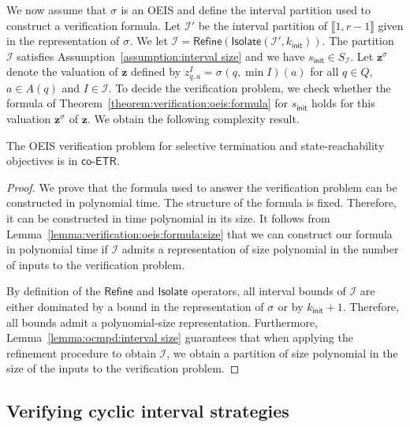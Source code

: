 \documentclass[a4paper,UKenglish,cleveref,autoref,thm-restate,colorlinks]{lipics-v2021}
\newcommand{\init}{\mathsf{init}}
\newcommand{\integerInterval}[1]{\llbracket{}#1\rrbracket{}}
\newcommand{\coetr}{\textsf{co-ETR}}
\newcommand{\mdpStateSpace}{S}
\newcommand{\ocStateSpace}{Q}
\newcommand{\ocState}{q}
\newcommand{\ocCount}{k}
\newcommand{\ocConfig}{s}
\newcommand{\ocActionSpace}{A}
\newcommand{\ocAction}{a}
\newcommand{\counterUB}{r}
\newcommand{\intPart}{\mathcal{I}}
\newcommand{\interval}{I}
\newcommand{\compressChainStateSpace}{\mdpStateSpace_{\intPart}}
\newcommand{\varStrat}{z}
\newcommand{\varStratTuple}{\mathbf{\varStrat}}
\newcommand{\vectStratTuple}{\varStratTuple^\strat}
\newcommand{\stratGeneric}[1]{{\sigma_{#1}}}
\newcommand{\strat}{\stratGeneric{}}
\begin{document}
We now assume that $\strat$ is an OEIS and define the interval partition used to construct a verification formula.
Let $\intPart'$ be the interval partition of $\integerInterval{1, \counterUB-1}$ given in the representation of $\strat$.
We let $\intPart = \mathsf{Refine}(\mathsf{Isolate}(\intPart', \ocCount_\init))$.
The partition $\intPart$ satisfies Assumption~\ref{assumption:interval size} and we have $\ocConfig_\init\in\compressChainStateSpace$.
Let $\vectStratTuple$ denote the valuation of $\varStratTuple$ defined by $\varStrat^\interval_{\ocState, \ocAction}=\strat(\ocState, \min\interval)(\ocAction)$ for all $\ocState\in\ocStateSpace$, $\ocAction\in\ocActionSpace(\ocState)$ and $\interval\in\intPart$.
To decide the verification problem, we check whether the formula of Theorem~\ref{theorem:verification:oeis:formula} for $\ocConfig_\init$ holds for this valuation $\vectStratTuple$ of $\varStratTuple$.
We obtain the following complexity result.
\begin{theorem}\label{theorem:verification:oeis:complexity}
  The OEIS verification problem for selective termination and state-reachability objectives is in $\coetr$.
\end{theorem}
\begin{proof}
  We prove that the formula used to answer the verification problem can be constructed in polynomial time.
  The structure of the formula is fixed.
  Therefore, it can be constructed in time polynomial in its size.
  It follows from Lemma~\ref{lemma:verification:oeis:formula:size} that we can construct our formula in polynomial time if $\intPart$ admits a representation of size polynomial in the number of inputs to the verification problem.

    By definition of the $\mathsf{Refine}$ and $\mathsf{Isolate}$ operators, all interval bounds of $\intPart$ are either dominated by a bound in the representation of $\strat$ or by $\ocCount_\init+1$.
  Therefore, all bounds admit a polynomial-size representation.
  Furthermore, Lemma~\ref{lemma:ocmpd:interval size} guarantees that when applying the refinement procedure to obtain $\intPart$, we obtain a partition of size polynomial in the size of the inputs to the verification problem.
\end{proof}

\subsection{Verifying cyclic interval strategies}\label{section:verification:algorithms:cis}
\end{document}
